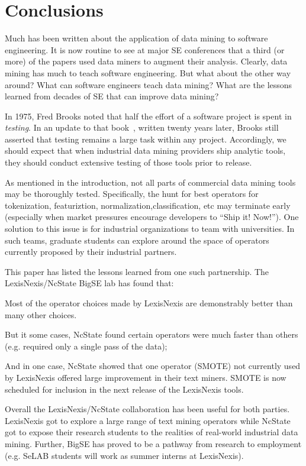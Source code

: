 \documentclass{sig-alternate-05-2015}
\newcommand{\bi}{\begin{itemize*}}
\newcommand{\ei}{\end{itemize*}}
\begin{document}
\section{Conclusions}
\label{sect:Conclusions}

Much has been written about the application of data mining
to software engineering. It is now routine to see at major SE
conferences that a third (or more) of the papers used data miners
to augment their analysis.
Clearly, data mining has much to teach software engineering.
But what about the other way around? What can software engineers teach
data mining? What are the lessons learned from decades of SE that
can improve data mining?

In 1975, Fred Brooks noted that half the effort 
of a software project is spent in {\em testing}. In an update
to that book~\cite{Brooks95}, written twenty years later, Brooks still
asserted that testing remains a large task within any project.
Accordingly, we should expect that when industrial data mining
providers ship analytic tools, they should conduct extensive
testing of those tools prior to release.

As mentioned in the introduction, not all parts of commercial data mining
tools may be thoroughly tested. Specifically, the hunt for best
operators for tokenization,  featuriztion,  normalization,classification, etc
may terminate early (especially when market pressures 
encourage developers to ``Ship it! Now!''). One solution to
this issue is for industrial organizations to team with universities.
In such teams, graduate students can explore around the space of
operators currently proposed by their industrial partners. 

This paper has listed the lessons learned from one such partnership.
The LexisNexis/NcState BigSE lab has found that:
\bi
\item 
Most  of the operator choices made by LexisNexis are
  demonstrably better than many other choices.
\item 
But it some cases, NcState found     certain operators
were much faster than others (e.g. required only a single pass
of the data);
\item
And in one case, NcState showed that one operator (SMOTE) not currently
used by LexisNexis offered large improvement in their text miners.
SMOTE is now scheduled for inclusion in the next release
of the LexisNexis tools.
\ei
Overall the LexisNexis/NcState collaboration has been useful
for both parties.
LexisNexis got to explore a large range of text mining operators while
NcState got to expose their research students to the
realities of real-world industrial data mining.
 Further, BigSE has proved to be a pathway from
research to employment (e.g. SeLAB  students  will work as    summer interns at  LexisNexis). 
\end{document}
